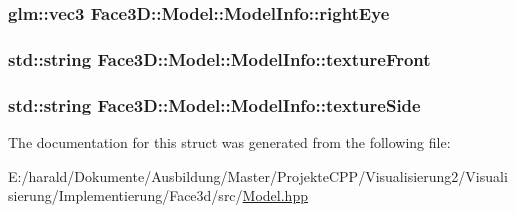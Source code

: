 \subsubsection[{\texorpdfstring{right\+Eye}{rightEye}}]{\setlength{\rightskip}{0pt plus 5cm}glm\+::vec3 Face3\+D\+::\+Model\+::\+Model\+Info\+::right\+Eye}\hypertarget{struct_face3_d_1_1_model_1_1_model_info_acc12c6496e68aa15bcdf996f9bb3b58f}{}\label{struct_face3_d_1_1_model_1_1_model_info_acc12c6496e68aa15bcdf996f9bb3b58f}
\subsubsection[{\texorpdfstring{texture\+Front}{textureFront}}]{\setlength{\rightskip}{0pt plus 5cm}std\+::string Face3\+D\+::\+Model\+::\+Model\+Info\+::texture\+Front}\hypertarget{struct_face3_d_1_1_model_1_1_model_info_aa31a18f8553efbb08c1e06bbce4785d7}{}\label{struct_face3_d_1_1_model_1_1_model_info_aa31a18f8553efbb08c1e06bbce4785d7}
\subsubsection[{\texorpdfstring{texture\+Side}{textureSide}}]{\setlength{\rightskip}{0pt plus 5cm}std\+::string Face3\+D\+::\+Model\+::\+Model\+Info\+::texture\+Side}\hypertarget{struct_face3_d_1_1_model_1_1_model_info_a0afbed21c950938c52f4a02da26cfb75}{}\label{struct_face3_d_1_1_model_1_1_model_info_a0afbed21c950938c52f4a02da26cfb75}


The documentation for this struct was generated from the following file\+:\begin{DoxyCompactItemize}
\item 
E\+:/harald/\+Dokumente/\+Ausbildung/\+Master/\+Projekte\+C\+P\+P/\+Visualisierung2/\+Visualisierung/\+Implementierung/\+Face3d/src/\hyperlink{_model_8hpp}{Model.\+hpp}\end{DoxyCompactItemize}
